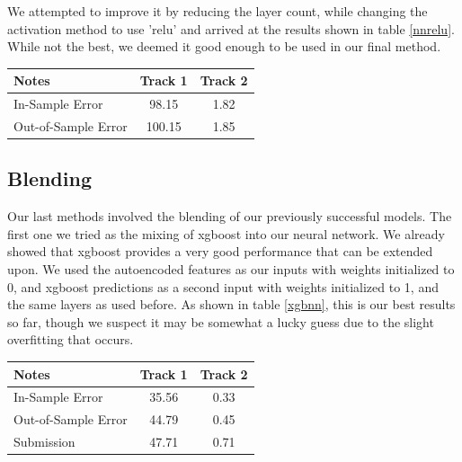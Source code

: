 \documentclass[a4paper, 12pt]{article}
\begin{document}
\begin{multicols}{2}
            We attempted to improve it by reducing the layer count, while changing the activation method to use 'relu' and arrived at the results shown in table \ref{nnrelu}. While not the best, we deemed it good enough to be used in our final method.

            \begin{center}
                \begin{tabular}{l|cc}
                    Notes & Track 1 & Track 2 \\
                    \hline
                    In-Sample Error & 98.15 & 1.82 \\
                    Out-of-Sample Error & 100.15 & 1.85 \\
                \end{tabular}
                \label{nnrelu}
            \end{center}

            \subsection{Blending}
                Our last methods involved the blending of our previously successful models. The first one we tried as the mixing of xgboost into our neural network. We already showed that xgboost provides a very good performance that can be extended upon. We used the autoencoded features as our inputs with weights initialized to 0, and xgboost predictions as a second input with weights initialized to 1, and the same layers as used before. As shown in table \ref{xgbnn}, this is our best results so far, though we suspect it may be somewhat a lucky guess due to the slight overfitting that occurs.

                \begin{center}
                    \begin{tabular}{l|cc}
                        Notes & Track 1 & Track 2 \\
                        \hline
                        In-Sample Error & 35.56 & 0.33 \\
                        Out-of-Sample Error & 44.79 & 0.45 \\
                        Submission & 47.71 & 0.71
                    \end{tabular}
                    \label{xgbnn}
                \end{center}


\end{multicols}
\end{document}
